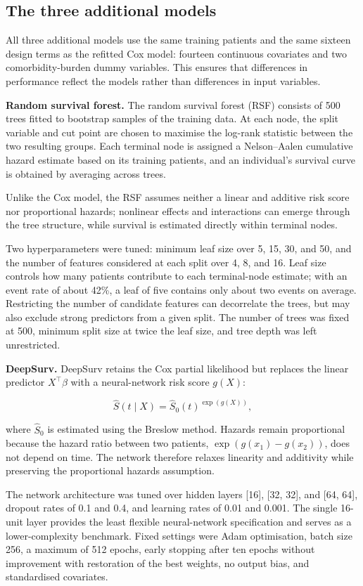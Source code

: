 \documentclass[11pt,a4paper]{article}
\begin{document}
\subsection{The three additional models}

All three additional models use the same training patients and the same sixteen design terms as the refitted Cox model: fourteen continuous covariates and two comorbidity-burden dummy variables. This ensures that differences in performance reflect the models rather than differences in input variables.

\textbf{Random survival forest.} The random survival forest (RSF) consists of 500 trees fitted to bootstrap samples of the training data. At each node, the split variable and cut point are chosen to maximise the log-rank statistic between the two resulting groups. Each terminal node is assigned a Nelson--Aalen cumulative hazard estimate based on its training patients, and an individual's survival curve is obtained by averaging across trees.

Unlike the Cox model, the RSF assumes neither a linear and additive risk score nor proportional hazards; nonlinear effects and interactions can emerge through the tree structure, while survival is estimated directly within terminal nodes.

Two hyperparameters were tuned: minimum leaf size over 5, 15, 30, and 50, and the number of features considered at each split over 4, 8, and 16. Leaf size controls how many patients contribute to each terminal-node estimate; with an event rate of about 42\%, a leaf of five contains only about two events on average. Restricting the number of candidate features can decorrelate the trees, but may also exclude strong predictors from a given split. The number of trees was fixed at 500, minimum split size at twice the leaf size, and tree depth was left unrestricted.

\textbf{DeepSurv.} DeepSurv retains the Cox partial likelihood but replaces the linear predictor $X^{\top}\beta$ with a neural-network risk score $g(X)$:

$$
\hat S(t \mid X) = \hat S_0(t)^{\exp(g(X))},
$$

where $\hat S_0$ is estimated using the Breslow method. Hazards remain proportional because the hazard ratio between two patients, $\exp(g(x_1)-g(x_2))$, does not depend on time. The network therefore relaxes linearity and additivity while preserving the proportional hazards assumption.

The network architecture was tuned over hidden layers [16], [32, 32], and [64, 64], dropout rates of 0.1 and 0.4, and learning rates of 0.01 and 0.001. The single 16-unit layer provides the least flexible neural-network specification and serves as a lower-complexity benchmark. Fixed settings were Adam optimisation, batch size 256, a maximum of 512 epochs, early stopping after ten epochs without improvement with restoration of the best weights, no output bias, and standardised covariates.
\end{document}
